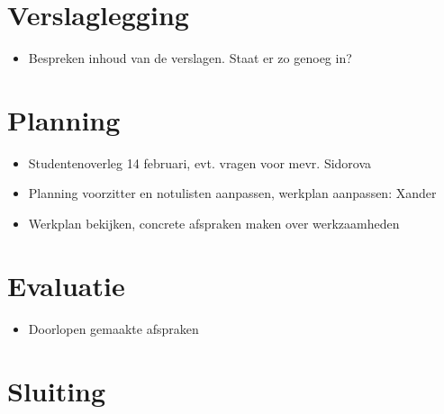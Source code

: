 \documentclass[]{article}
\begin{document}
\section{Verslaglegging}

  \begin{itemize}
    \item Bespreken inhoud van de verslagen. Staat er zo genoeg in?
  \end{itemize}

\section{Planning}
  \begin{itemize}
    \item Studentenoverleg 14 februari, evt. vragen voor mevr. Sidorova
    \item Planning voorzitter en notulisten aanpassen, werkplan aanpassen: Xander
    \item Werkplan bekijken, concrete afspraken maken over werkzaamheden
  \end{itemize}

\section{Evaluatie}
  \begin{itemize}
    \item Doorlopen gemaakte afspraken
  \end{itemize}

\section{Sluiting}
\end{document}
